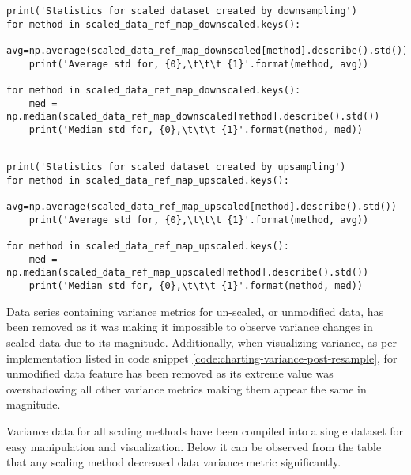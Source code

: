 \begin{code}
\label{code:scalers:getting-metrics-downsample}
\begin{verbatim}
print('Statistics for scaled dataset created by downsampling')
for method in scaled_data_ref_map_downscaled.keys():
    avg=np.average(scaled_data_ref_map_downscaled[method].describe().std())
    print('Average std for, {0},\t\t\t {1}'.format(method, avg))
    
for method in scaled_data_ref_map_downscaled.keys():
    med = np.median(scaled_data_ref_map_downscaled[method].describe().std())
    print('Median std for, {0},\t\t\t {1}'.format(method, med))
    \end{verbatim}
\end{code}

\begin{code}
\label{code:scalers:getting-metrics-upsample}
\begin{verbatim}

print('Statistics for scaled dataset created by upsampling')
for method in scaled_data_ref_map_upscaled.keys():
    avg=np.average(scaled_data_ref_map_upscaled[method].describe().std())
    print('Average std for, {0},\t\t\t {1}'.format(method, avg))
    
for method in scaled_data_ref_map_upscaled.keys():
    med = np.median(scaled_data_ref_map_upscaled[method].describe().std())
    print('Median std for, {0},\t\t\t {1}'.format(method, med))
        \end{verbatim}
\end{code}

Data series containing variance metrics for un-scaled, or unmodified data, has been removed as it was making it impossible to observe variance changes in scaled data due to its magnitude. Additionally, when visualizing variance, as per implementation listed in code snippet \ref{code:charting-variance-post-resample}, for unmodified data \fileAgeInSec{} feature has been removed as its extreme value was overshadowing all other variance metrics making them appear the same in magnitude. 

Variance data for all scaling methods have been compiled into a single dataset for easy manipulation and visualization. Below it can be observed from the table that any scaling method decreased data variance metric significantly.

